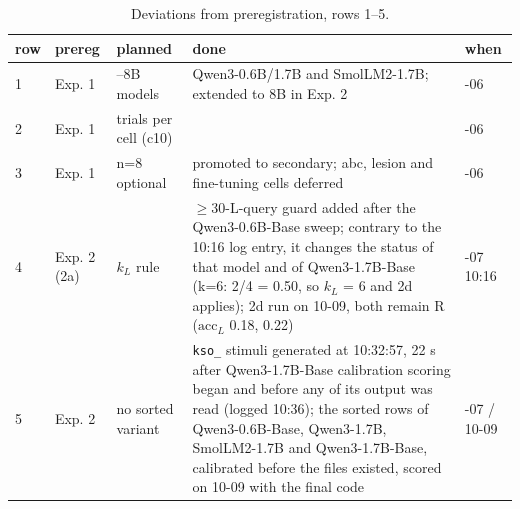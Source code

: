 \documentclass[11pt]{article}
\begin{document}
\begin{table}[tbp]
\centering
\small
\caption{Deviations from preregistration, rows 1--5.}\label{tab:app-dev-1}
\begin{tabularx}{\linewidth}{@{}l>{\raggedright\arraybackslash\hsize=0.3482\hsize}X>{\raggedright\arraybackslash\hsize=0.4510\hsize}X>{\raggedright\arraybackslash\hsize=2.9041\hsize}X>{\raggedright\arraybackslash\hsize=0.2967\hsize}X@{}}
\toprule
row & prereg & planned & done & when \\
\midrule
1 & Exp. 1 & 7--8B models & Qwen3-0.6B/1.7B and SmolLM2-1.7B; extended to 8B in Exp. 2 & 10-06 \\
2 & Exp. 1 & 200 trials per cell (c10) & 100 & 10-06 \\
3 & Exp. 1 & n=8 optional & promoted to secondary; abc, lesion and fine-tuning cells deferred & 10-06 \\
4 & Exp. 2 (2a) & $k_L$ rule & $\geq 30$-L-query guard added after the Qwen3-0.6B-Base sweep; contrary to the 10:16 log entry, it changes the status of that model and of Qwen3-1.7B-Base (k=6: 2/4 = 0.50, so $k_L$ = 6 and 2d applies); 2d run on 10-09, both remain R ($\mathrm{acc}_L$ 0.18, 0.22) & 10-07 10:16 \\
5 & Exp. 2 & no sorted variant & \texttt{kso\_} stimuli generated at 10:32:57, 22 s after Qwen3-1.7B-Base calibration scoring began and before any of its output was read (logged 10:36); the sorted rows of Qwen3-0.6B-Base, Qwen3-1.7B, SmolLM2-1.7B and Qwen3-1.7B-Base, calibrated before the files existed, scored on 10-09 with the final code & 10-07 / 10-09 \\
\bottomrule
\end{tabularx}
\end{table}
\end{document}
